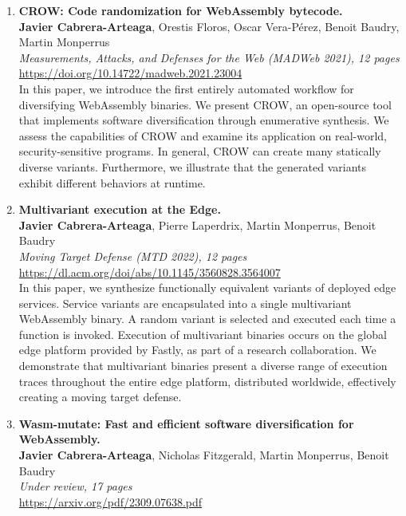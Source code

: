 \begin{enumerate}[label={\textbf{P\arabic*}:}, ref={P\arabic*}]
	\item \label{crowpaper} \textbf{CROW: Code randomization for WebAssembly bytecode.} \\ 
	\textbf{Javier Cabrera-Arteaga}, Orestis Floros, Oscar Vera-Pérez, Benoit Baudry, Martin Monperrus\\
	\textit{ Measurements, Attacks, and Defenses for the Web (MADWeb 2021), 12 pages} \\
	\url{https://doi.org/10.14722/madweb.2021.23004} \\
	
	 In this paper, we introduce the first entirely automated workflow for diversifying WebAssembly binaries. 
	We present CROW, an open-source tool that implements software diversification through enumerative synthesis. 
	We assess the capabilities of CROW and examine its application on real-world, security-sensitive programs.
	In general, CROW can create many statically diverse variants. 
	Furthermore, we illustrate that the generated variants exhibit different behaviors at runtime.

	
	
	\item \label{mewepaper} \textbf{Multivariant execution at the Edge. } \\
	\textbf{Javier Cabrera-Arteaga}, Pierre Laperdrix, Martin Monperrus, Benoit Baudry\\
    \textit{Moving Target Defense (MTD 2022), 12 pages} \\
    \url{https://dl.acm.org/doi/abs/10.1145/3560828.3564007} \\

	In this paper, we synthesize functionally equivalent variants of deployed edge services. 
	Service variants are encapsulated into a single multivariant WebAssembly binary. 
	A random variant is selected and executed each time a function is invoked.
	Execution of multivariant binaries occurs on the global edge platform provided by Fastly, as part of a research collaboration. 
	We demonstrate that multivariant binaries present a diverse range of execution traces throughout the entire edge platform, distributed worldwide, effectively creating a moving target defense.

	
	\item \label{wasmmutatepaper}\textbf{Wasm-mutate: Fast and efficient software diversification for WebAssembly. }\\ 
	\textbf{Javier Cabrera-Arteaga}, Nicholas Fitzgerald, Martin Monperrus, Benoit Baudry\\
	\textit{Under review, 17 pages} \\
	\url{https://arxiv.org/pdf/2309.07638.pdf}


\end{enumerate}
